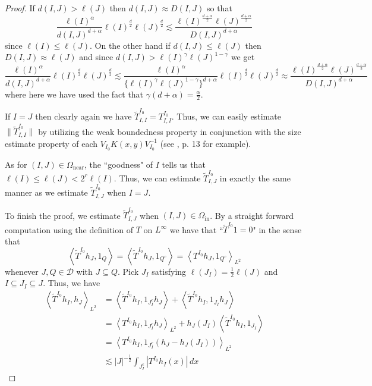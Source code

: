 \documentclass[12pt,reqno ]{amsart}
\numberwithin{equation}{section}
\theoremstyle{definition}
\newcommand{\D}{\ensuremath{\mathscr{D}}}
\newcommand{\ip}[2]{\ensuremath{\left\langle#1,#2\right\rangle}}
\newcommand{\W}[1]{\ensuremath{\widetilde{#1}}}
\newcommand{\T}[1]{\ensuremath{\text{#1}}}
\begin{document}
\begin{proof}
If $d(I, J) > \ell(J)$ then $d(I, J) \approx D(I, J)$ so that \begin{equation*} \frac{\ell(I)^\alpha}{d(I, J) ^{d + \alpha}}  \ell(I)^{\frac{d}{2}} \ell(J)^{\frac{d}{2}} \lesssim \frac{\ell(I)^\frac{d + \alpha}{2} \ell(J)^\frac{d + \alpha}{2}}{D(I, J)^{d + \alpha}}  \end{equation*} since $\ell(I) \leq \ell(J)$.  On the other hand if $d(I, J) \leq \ell(J)$ then $D(I, J) \approx \ell(J)$ and since  $d(I, J) > \ell(I) ^\gamma \ell(J)^{1 - \gamma}$ we get \begin{equation*} \frac{\ell(I)^\alpha}{d(I, J) ^{d + \alpha}}  \ell(I)^{\frac{d}{2}} \ell(J)^{\frac{d}{2}} \lesssim \frac{\ell(I)^\alpha}{\{\ell(I) ^\gamma \ell(J)^{1 - \gamma}\} ^{d + \alpha}}  \ell(I)^{\frac{d}{2}} \ell(J)^{\frac{d}{2}} \approx \frac{\ell(I)^\frac{d + \alpha}{2} \ell(J)^\frac{d + \alpha}{2}}{D(I, J)^{d + \alpha}} \end{equation*} where here we have used the fact that $\gamma(d + \alpha) = \frac{\alpha}{2}$.


If $I = J$ then clearly again we have $\W{T}^{I_0} _{I,I} = {T}^{I_0} _{I, I}$.  Thus, we can easily estimate $\|\W{T}^{I_0} _{I, I}\| $ by utilizing the weak boundedness property in conjunction with the size estimate property of each $V_{I_0} K(x, y) V_{I_0}^{-1}$ (see \cite{H}, p. 13 for example).

As for $(I, J) \in \Omega_{\T{near}}$, the ``goodness" of $I$ tells us that $\ell(I) \leq \ell(J) < 2^r \ell(I)$.   Thus, we can estimate $\W{T}^{I_0} _{I, J}$ in exactly the same manner as we estimate  $\W{T}^{I_0} _{I, J}$ when $I = J$.

To finish the proof, we estimate $\W{T}^{I_0} _{I, J}$ when $(I, J) \in \Omega_{\T{in}}$. By a straight forward computation using the definition of $T$ on $L^\infty$ we have that  ``$\W{T} ^{I_0} 1 = 0$" in the sense that \begin{equation} \ip{\W{T}^{I_0} h_J}{1_Q} = \ip{\W{T}^{I_0} h_J}{1_{Q^c}} =  \ip{{T}^{I_0} h_J}{1_{Q^c}}_{L^2} \label{T1=0} \end{equation} whenever $J, Q \in \D$ with $J \subseteq Q$.    Pick $J_I$ satisfying $\ell(J_I) = \frac12 \ell(J)$  and $I \subseteq J_I \subseteq J$.  Thus,  we have \begin{align*} \ip{\W{T}^{I_0} h_I}{h_J}_{L^2} & = \ip{  \W{T}^{I_0} h_I}{  1_{J_I ^c} h_J} + \ip{\W{T}^{I_0} h_I}{ 1_{J_I} h_J} \\ & = \ip{{T}^{I_0} h_I}{1_{J_I ^c } h_J}_{L^2} + h_J(J_I) \ip{{\W{T}}^{I_0} h_I}{ 1_{J_I} } \\ & = \ip{{T}^{I_0} h_I  }{1_{J_I ^c} (h_J - h_J(J_I))}_{L^2}  \\ & \lesssim |J|^{-\frac12} \int_{J_I ^c} |{T}^{I_0} h_I(x)| \, dx  \end{align*}


\end{proof}
\end{document}
